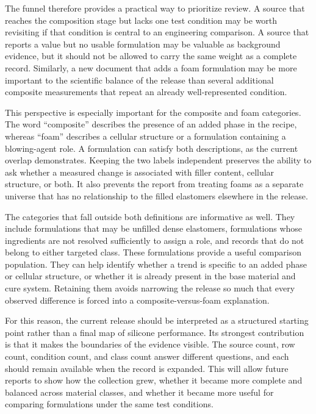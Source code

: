 \documentclass[10pt]{article}
\begin{document}
The funnel therefore provides a practical way to prioritize review. A source
that reaches the composition stage but lacks one test condition may be worth
revisiting if that condition is central to an engineering comparison. A source
that reports a value but no usable formulation may be valuable as background
evidence, but it should not be allowed to carry the same weight as a complete
record. Similarly, a new document that adds a foam formulation may be more
important to the scientific balance of the release than several additional
composite measurements that repeat an already well-represented condition.

This perspective is especially important for the composite and foam categories.
The word “composite” describes the presence of an added phase in the recipe,
whereas “foam” describes a cellular structure or a formulation containing a
blowing-agent role. A formulation can satisfy both descriptions, as the current
overlap demonstrates. Keeping the two labels independent preserves the ability
to ask whether a measured change is associated with filler content, cellular
structure, or both. It also prevents the report from treating foams as a
separate universe that has no relationship to the filled elastomers elsewhere
in the release.

The categories that fall outside both definitions are informative as well.
They include formulations that may be unfilled dense elastomers, formulations
whose ingredients are not resolved sufficiently to assign a role, and records
that do not belong to either targeted class. These formulations provide a useful
comparison population. They can help identify whether a trend is specific to an
added phase or cellular structure, or whether it is already present in the base
material and cure system. Retaining them avoids narrowing the release so much
that every observed difference is forced into a composite-versus-foam
explanation.

For this reason, the current release should be interpreted as a structured
starting point rather than a final map of silicone performance. Its strongest
contribution is that it makes the boundaries of the evidence visible. The
source count, row count, condition count, and class count answer different
questions, and each should remain available when the record is expanded. This
will allow future reports to show how the collection grew, whether it became
more complete and balanced across material classes, and whether it became more
useful for comparing formulations under the same test conditions.
\end{document}

